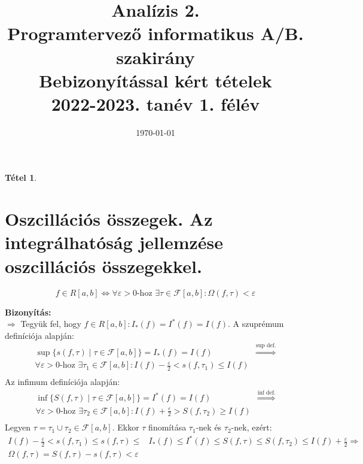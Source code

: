 \documentclass{article}
\date{\today}
\title{%
	\textbf{Analízis 2.} \\
	\textbf{Programtervező informatikus A/B. szakirány} \\
	\medskip
	Bebizonyítással kért tételek\\
	\large 2022-2023. tanév 1. félév
}
\newtheorem{theorem}{Tétel}
\renewenvironment{proof}{\textbf{Bizonyítás:} \\}{\hfill}
\begin{document}
\maketitle
\tableofcontents
\newpage

\begin{theorem}
\section{Oszcillációs összegek. Az integrálhatóság jellemzése oszcillációs összegekkel.}
\begin{equation*}
    f\in R[a,b] \Longleftrightarrow \forall \varepsilon > 0\textrm{-hoz }\exists\tau \in\mathcal{F}[a,b]: \Omega (f,\tau)<\varepsilon
\end{equation*}
\end{theorem}
\begin{proof}
$\boxed{\Longrightarrow}$ Tegyük fel, hogy $f\in R[a,b]: I_*(f)=I^*(f)=I(f)$. A szuprémum definíciója alapján:
\begin{equation*}
\begin{split}
    \operatorname{sup}\{s(f,\tau) \mid \tau \in \mathcal{F}[a,b]\} =I_*(f)=I(f) & \overset{\textrm{sup def.}}{\Longrightarrow} \\
    \forall \varepsilon > 0\textrm{-hoz }\exists \tau_1\in \mathcal{F}[a,b]:I(f)-\frac{\varepsilon}{2}<s(f,\tau_1)\leq I(f) \\
\end{split}
\end{equation*}
Az infimum definíciója alapján:
\begin{equation*}
\begin{split}
    \operatorname{inf}\{S(f,\tau) \mid \tau \in \mathcal{F}[a,b]\} =I^*(f)=I(f) & \overset{\textrm{inf def.}}{\Longrightarrow} \\
    \forall \varepsilon > 0\textrm{-hoz }\exists \tau_2\in \mathcal{F}[a,b]:I(f)+\frac{\varepsilon}{2}>S(f,\tau_2)\geq I(f) \\
\end{split}
\end{equation*}
Legyen $\tau=\tau_1\cup\tau_2\in\mathcal{F}[a,b]$. Ekkor $\tau$ finomítása $\tau_1$-nek és $\tau_2$-nek, ezért:
\begin{equation*}
\begin{split}
    I(f)-\frac{\varepsilon}{2}<s(f,\tau_1)\leq s(f,\tau)\leq& I_*(f)\leq I^*(f)\leq S(f,\tau)\leq S(f,\tau_2)\leq I(f)+\frac{\varepsilon}{2} \Longrightarrow \\
    \Omega(f,\tau)=S(f,\tau)-s(f,\tau)<\varepsilon \\

\end{split}
\end{equation*}
\end{proof}
\end{document}
